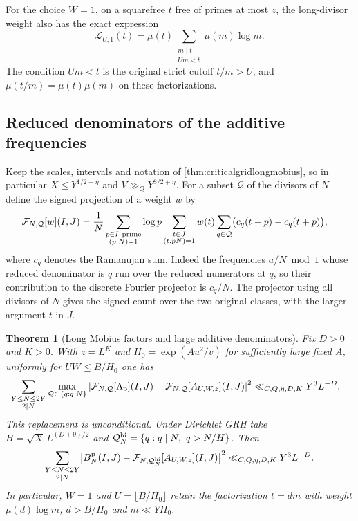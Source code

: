 \documentclass[11pt,a4paper]{article}
\numberwithin{equation}{section}
\newtheorem{theorem}{Theorem}[section]
\begin{document}
For the choice $W=1$, on a squarefree $t$ free
of primes at most $z$, the long-divisor weight
also has the exact expression
\begin{equation}
 \mathcal L_{U,1}(t)
   =\mu(t)\sum_{\substack{m\mid t\\ Um<t}}\mu(m)\log m .
 \label{eq:criticalgridcomplementarymobius}
\end{equation}
The condition $Um<t$ is the original strict
cutoff $t/m>U$, and $\mu(t/m)=\mu(t)\mu(m)$
on these factorizations.

\clearpage
\subsection{Reduced denominators of the additive frequencies}

Keep the scales, intervals and notation of
\cref{thm:criticalgridlongmobius}, so in particular
$X\le Y^{1/2-\eta}$ and $V\gg_Q Y^{3/2+\eta}$.
For a subset $\mathcal Q$ of the divisors of $N$
define the signed projection of a weight $w$ by
\begin{align*}
 \mathcal F_{N,\mathcal Q}[w](I,J)
 ={}&\frac1N
 \sum_{\substack{p\in I\ {\rm prime}\\(p,N)=1}}\log p
 \sum_{\substack{t\in J\\(t,pN)=1}} w(t)
 \sum_{q\in\mathcal Q}\bigl(c_q(t-p)-c_q(t+p)\bigr),
\end{align*}
where $c_q$ denotes the Ramanujan sum. Indeed the
frequencies $a/N\bmod 1$ whose reduced denominator
is $q$ run over the reduced numerators at $q$,
so their contribution to the discrete Fourier
projector is $c_q/N$. The projector using all
divisors of $N$ gives the signed count over the
two original classes, with the larger argument
$t$ in $J$.

\begin{theorem}[Long M\"obius factors and large additive denominators]
\label{thm:criticalgridadditiveorder}
Fix $D>0$ and $K>0$. With $z=L^K$ and
$H_0=\exp(Au^2/v)$ for sufficiently large fixed $A$,
uniformly for $UW\le B/H_0$ one has
\begin{align}
 &\sum_{\substack{Y\le N\le2Y\\2\mid N}}
       \max_{\mathcal Q\subset\{q:q\mid N\}}
       \left|\mathcal F_{N,\mathcal Q}[\Lambda_{\rm p}](I,J)
              -\mathcal F_{N,\mathcal Q}[A_{U,W,z}](I,J)\right|^2
       \ll_{C,Q,\eta,D,K} Y^3L^{-D}.
 \label{eq:criticalgridprojectedreplacement}
\end{align}
This replacement is unconditional. Under Dirichlet
GRH take $H=\sqrt X\, L^{(D+9)/2}$ and
$\mathcal Q_N^{\rm hi}=\{q:q\mid N,\ q>N/H\}$.
Then
\begin{equation}
 \sum_{\substack{Y\le N\le2Y\\2\mid N}}
       \bigl|B_N^{\rm p}(I,J)
               -\mathcal F_{N,\mathcal Q_N^{\rm hi}}[A_{U,W,z}](I,J)
       \bigr|^2
        \ll_{C,Q,\eta,D,K}Y^3 L^{-D}.
 \label{eq:criticalgridjointfilter}
\end{equation}
In particular, $W=1$ and $U=\lfloor B/H_0\rfloor$
retain the factorization $t=dm$ with weight $\mu(d)\log m$,
$d>B/H_0$ and $m\ll YH_0$.
\end{theorem}
\end{document}
